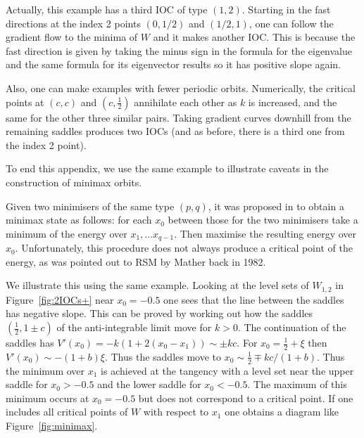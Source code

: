 \documentclass[12pt]{article}
\begin{document}
Actually, this example has a third IOC of type $(1,2)$.  Starting in the fast directions at the index 2 points $(0,1/2)$ and $(1/2, 1)$, one can follow the gradient flow to the minima of $W$ and it makes another IOC.  This is because the fast direction is given by taking the minus sign in the formula for the eigenvalue and the same formula for its eigenvector results so it has positive slope again.

Also, one can make examples with fewer periodic orbits.  Numerically, the critical points at $(c,c)$ and $(c,\tfrac12)$ annihilate each other as $k$ is increased, and the same for the other three similar pairs.  Taking gradient curves downhill from the remaining saddles produces two IOCs (and as before, there is a third one from the index 2 point).

To end this appendix, we use the same example to illustrate caveats in the construction of minimax orbits.

Given two minimisers of the same type $(p,q)$, it was proposed in \cite{ALA} to obtain a minimax state as follows: for each $x_0$ between those for the two minimisers take a minimum of the energy over $x_1,\ldots x_{q-1}$.  Then maximise the resulting energy over $x_0$.  Unfortunately, this procedure does not always produce a critical point of the energy, as was pointed out to RSM by Mather back in 1982.

We illustrate this using the same example.  Looking at the level sets of $W_{1,2}$ in Figure~\ref{fig:2IOCs+} near $x_0=-0.5$ one sees that the line between the saddles has negative slope.
This can be proved by working out how the saddles $(\frac12,1\pm c)$ of the anti-integrable limit move for $k>0$.  The continuation of the saddles has $V'(x_0) = -k(1+2(x_0-x_1)) \sim \pm k c$.  For $x_0 = \frac12 + \xi$ then $V'(x_0) \sim -(1+b) \xi$.  Thus the saddles move to $x _0 \sim \frac12 \mp kc/(1+b)$.
Thus the minimum over $x_1$ is achieved at the tangency with a level set near the upper saddle for $x_0>-0.5$ and the lower saddle for $x_0 < -0.5$.  The maximum of this minimum occurs at $x_0=-0.5$ but does not correspond to a critical point.  If one includes all critical points of $W$ with respect to $x_1$ one obtains a diagram like Figure~\ref{fig:minimax}.
\end{document}
